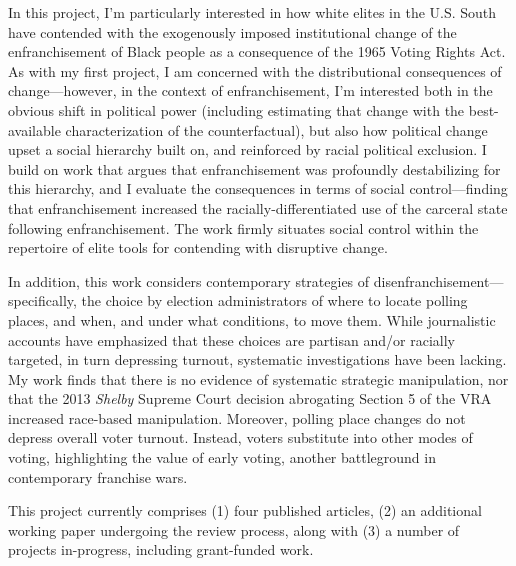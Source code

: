 \documentclass[11pt]{article}
\begin{document}
In this project, I'm particularly interested in how white elites in the U.S. South have contended with the exogenously imposed institutional change of the enfranchisement of Black people as a consequence of the 1965 Voting Rights Act.  As with my first project, I am concerned with the distributional consequences of change---however, in the context of enfranchisement, I'm interested both in the obvious shift in political power (including estimating that change with the best-available characterization of the counterfactual), but also how political change upset a social hierarchy built on, and reinforced by racial political exclusion.  I build on work that argues that enfranchisement was profoundly destabilizing for this hierarchy, and I evaluate the consequences in terms of social control---finding that enfranchisement increased the racially-differentiated use of the carceral state following enfranchisement.  The work firmly situates social control within the repertoire of elite tools for contending with disruptive change.

In addition, this work considers contemporary strategies of disenfranchisement---specifically, the choice by election administrators of where to locate polling places, and when, and under what conditions, to move them.  While journalistic accounts have emphasized that these choices are partisan and/or racially targeted, in turn depressing turnout, systematic investigations have been lacking.  My work finds that there is no evidence of systematic strategic manipulation, nor that the 2013 \emph{Shelby} Supreme Court decision abrogating Section 5 of the VRA increased race-based manipulation.  Moreover, polling place changes do not depress overall voter turnout.  Instead, voters substitute into other modes of voting, highlighting the value of early voting, another battleground in contemporary franchise wars.


This project currently comprises (1) four published articles, (2) an additional working paper undergoing the review process, along with (3) a number of projects in-progress, including grant-funded work.
\end{document}
